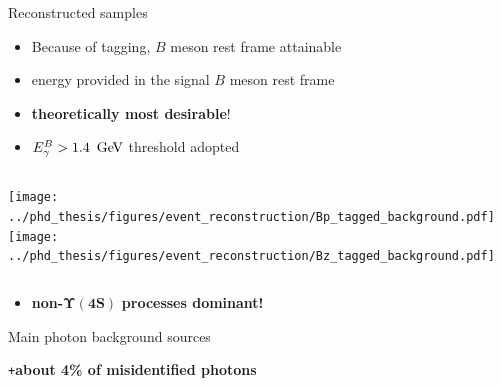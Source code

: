 \documentclass[xcolor=dvipsnames]{beamer}
\begin{document}
\begin{frame}{Reconstructed samples}
   \scriptsize
   \begin{itemize}
      \item Because of tagging, $B$ meson rest frame attainable
      \item[\ra] energy provided in the signal $B$ meson rest frame
      \item[\ra] \textbf{theoretically most desirable}!
      \item ${E^B_{\gamma}}>1.4~\mathrm{\,Ge\kern -0.1em V}$ threshold adopted

   \end{itemize}
   \begin{columns}
      \texttt{[image: ../phd\_thesis/figures/event\_reconstruction/Bp\_tagged\_background.pdf]}
      \texttt{[image: ../phd\_thesis/figures/event\_reconstruction/Bz\_tagged\_background.pdf]}
   \end{columns}
   \begin{itemize}
      \item[\ra] \textbf{non-}$\bm{\Upsilon(4S)}$ \textbf{processes dominant!}
   \end{itemize}
\end{frame}

\begin{frame}{Main photon background sources}
\centering\scriptsize



{\large \texttt{+}\textbf{about 4\% of misidentified photons}}

\end{frame}
\end{document}
